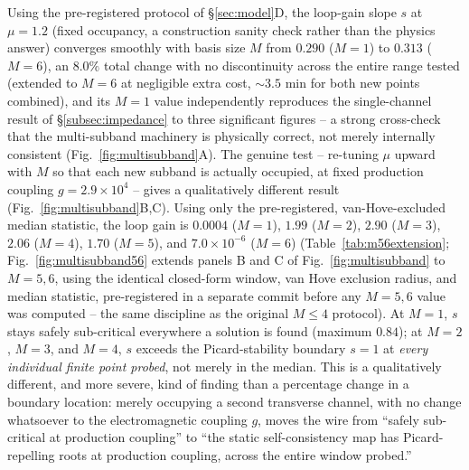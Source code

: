 \documentclass[aps,physrev,reprint,superscriptaddress,amsmath,amssymb,floatfix]{revtex4-2}
\begin{document}
Using the pre-registered protocol of \S\ref{sec:model}D, the loop-gain
slope $s$ at $\mu=1.2$ (fixed occupancy, a construction sanity check
rather than the physics answer) converges smoothly with basis size $M$
from $0.290$ ($M=1$) to $0.313$ ($M=6$), an $8.0\%$ total change with no
discontinuity across the entire range tested (extended to $M=6$ at
negligible extra cost, $\sim3.5$ min for both new points combined), and
its $M=1$ value independently reproduces the single-channel result of
\S\ref{subsec:impedance} to three significant figures -- a strong
cross-check that the multi-subband machinery is physically correct, not
merely internally consistent (Fig.~\ref{fig:multisubband}A). The genuine
test -- re-tuning $\mu$ upward with $M$ so that each new subband is
actually occupied, at fixed production coupling $g=2.9\times10^4$ --
gives a qualitatively different result (Fig.~\ref{fig:multisubband}B,C).
Using only the pre-registered, van-Hove-excluded median statistic, the
loop gain is $0.0004$ ($M=1$), $1.99$ ($M=2$), $2.90$ ($M=3$), $2.06$
($M=4$), $1.70$ ($M=5$), and $7.0\times10^{-6}$ ($M=6$)
(Table~\ref{tab:m56extension}; Fig.~\ref{fig:multisubband56} extends
panels B and C of Fig.~\ref{fig:multisubband} to $M=5,6$, using the
identical closed-form window, van Hove exclusion radius, and median
statistic, pre-registered in a separate commit before any $M=5,6$ value
was computed -- the same discipline as the original $M\leq4$ protocol).
At $M=1$, $s$ stays safely sub-critical everywhere a solution is found
(maximum $0.84$); at $M=2$, $M=3$, and $M=4$, $s$ exceeds the
Picard-stability boundary $s=1$ at \emph{every individual finite point
probed}, not merely in the median. This is a qualitatively different,
and more severe, kind of finding than a percentage change in a boundary
location: merely occupying a second transverse channel, with no change
whatsoever to the electromagnetic coupling $g$, moves the wire from
``safely sub-critical at production coupling'' to ``the static
self-consistency map has Picard-repelling roots at production coupling,
across the entire window probed.''
\end{document}
